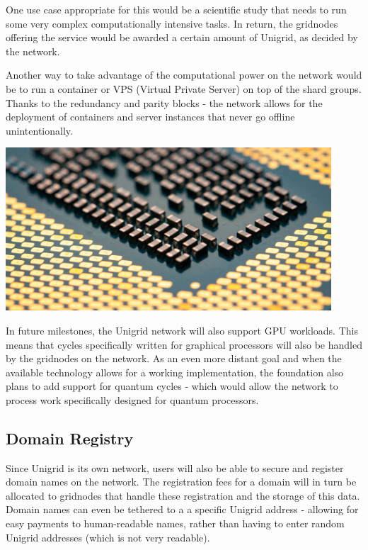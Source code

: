 \documentclass{article}
\begin{document}
One use case appropriate for this would be a scientific study that needs to run some very complex computationally intensive tasks. In return, the gridnodes offering the service would be awarded a certain amount of Unigrid, as decided by the network. 

Another way to take advantage of the computational power on the network would be to run a container or VPS (Virtual Private Server) on top of the shard groups. Thanks to the redundancy and parity blocks - the network allows for the deployment of containers and server instances that never go offline unintentionally.

\begin{mdframed}[style=textimage]
	\includegraphics[width=345pt]{compute}
\end{mdframed}

\noindent In future milestones, the Unigrid network will also support GPU workloads. This means that cycles specifically written for graphical processors will also be handled by the gridnodes on the network. As an even more distant goal and when the available technology allows for a working implementation, the foundation also plans to add support for quantum cycles - which would allow the network to process work specifically designed for quantum processors.

\subsection{Domain Registry}
Since Unigrid is its own network, users will also be able to secure and register domain names on the network. The registration fees for a domain will in turn be allocated to gridnodes that handle these registration and the storage of this data. Domain names can even be tethered to a a specific Unigrid address - allowing for easy payments to human-readable names, rather than having to enter random Unigrid addresses (which is not very readable).
\end{document}
